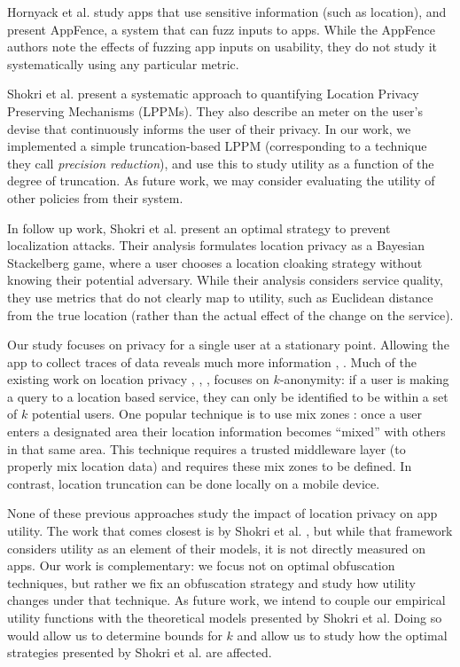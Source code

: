 Hornyack et al. \cite{Hornyack:2011} study apps that use sensitive
information (such as location), and present AppFence, a system that
can fuzz inputs to apps. While the AppFence authors note the effects of
fuzzing app inputs on usability, they do not study it systematically
using any particular metric.

Shokri et al. \cite{Shokri:2011} present a systematic approach to
quantifying Location Privacy Preserving Mechanisms (LPPMs).  They also
describe an meter on the user's devise that
continuously informs the user of their privacy.  In our work, we implemented a simple
truncation-based LPPM (corresponding to a technique they call
\emph{precision reduction}), and use this to study
utility as a function of the degree of truncation. As future work, we
may consider evaluating the utility of other policies from their
system.

In follow up work, Shokri et al. \cite{Shokri:2012} present an
optimal strategy to prevent localization attacks.
Their analysis formulates location privacy as a Bayesian Stackelberg 
game, where a user chooses a location cloaking strategy without 
knowing their potential adversary.
While their analysis considers service quality, they use metrics that do 
not clearly map to utility, such as Euclidean distance from the 
true location (rather than the actual effect of the change on the service).

Our study focuses on privacy for a single user at a stationary point.
Allowing the app to collect traces of data reveals much more
information \cite{Gruteser:2005}, \cite{Golle:2009}.  Much of the
existing work on location privacy \cite{Beresford:2004}, \cite{Bettini:2005},
\cite{Hoh:2005}, \cite{Gruteser:2003} focuses on $k$-anonymity: if a
user is making a query to a location based service, they can only be
identified to be within a set of $k$ potential users.  
One popular
technique is to use mix zones \cite{Beresford:2004}: once a user enters 
a designated area their location information becomes ``mixed'' with 
others in that same area.  This technique requires a trusted middleware 
layer (to properly mix location data) and requires these mix zones 
to be defined.  In contrast, location truncation can be done locally
on a mobile device.

None of these previous approaches study the impact of location privacy
on app utility.  The work that comes closest is by Shokri et
al. \cite{Shokri:2012}, but while that framework considers utility as
an element of their models, it is not directly measured on apps.  Our
work is complementary: we focus not on optimal obfuscation techniques,
but rather we fix an obfuscation strategy and study how utility
changes under that technique.  As future work, we intend to couple our 
empirical utility functions with the theoretical models presented by
Shokri et al.
Doing so would allow us to determine bounds for $k$ and allow us to study 
how the optimal strategies presented by Shokri et al.
are affected.

